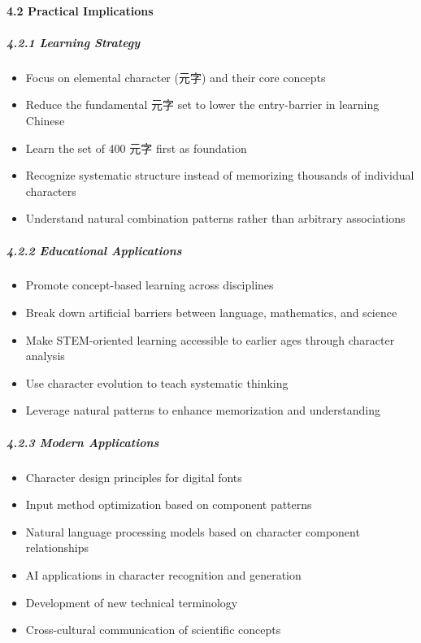 \paragraph{4.2 Practical Implications}\label{practical-implications}

\subparagraph{4.2.1 Learning Strategy}\label{learning-strategy}

\begin{itemize}
\tightlist
\item
  Focus on elemental character (元字) and their core concepts
\item
  Reduce the fundamental 元字 set to lower the entry-barrier in learning
  Chinese
\item
  Learn the set of 400 元字 first as foundation
\item
  Recognize systematic structure instead of memorizing thousands of
  individual characters
\item
  Understand natural combination patterns rather than arbitrary
  associations
\end{itemize}

\subparagraph{4.2.2 Educational
Applications}\label{educational-applications}

\begin{itemize}
\tightlist
\item
  Promote concept-based learning across disciplines
\item
  Break down artificial barriers between language, mathematics, and
  science
\item
  Make STEM-oriented learning accessible to earlier ages through
  character analysis
\item
  Use character evolution to teach systematic thinking
\item
  Leverage natural patterns to enhance memorization and understanding
\end{itemize}

\subparagraph{4.2.3 Modern Applications}\label{modern-applications}

\begin{itemize}
\tightlist
\item
  Character design principles for digital fonts
\item
  Input method optimization based on component patterns
\item
  Natural language processing models based on character component
  relationships
\item
  AI applications in character recognition and generation
\item
  Development of new technical terminology
\item
  Cross-cultural communication of scientific concepts
\end{itemize}

